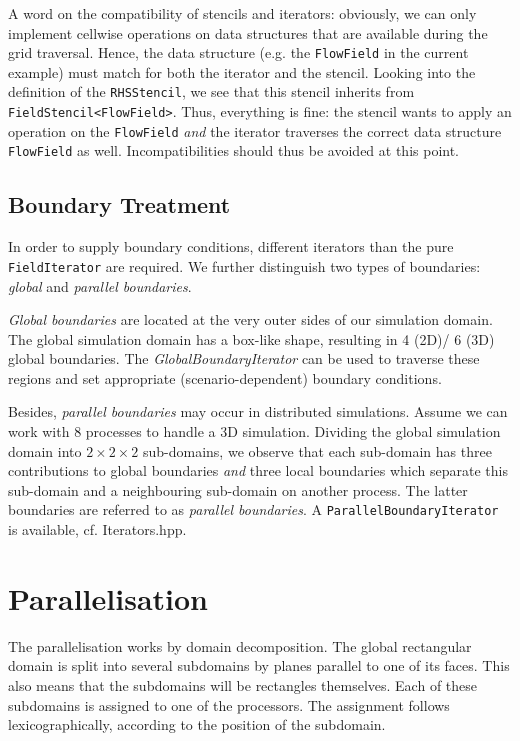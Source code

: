 \documentclass[pdftex,A4]{article}
\begin{document}
A word on the compatibility of stencils and iterators: obviously, we can only implement cellwise operations on data structures that are available during the grid traversal.
Hence, the data structure (e.g. the {\tt FlowField} in the current example) must match for both the iterator and the stencil.
Looking into the definition of the {\tt RHSStencil}, we see that this stencil inherits from {\tt FieldStencil<FlowField>}.
Thus, everything is fine: the stencil wants to apply an operation on the {\tt FlowField} {\it and} the iterator traverses the correct data structure {\tt FlowField} as well.
Incompatibilities should thus be avoided at this point.

\subsection{Boundary Treatment}\label{sec:boundary_treatment}

In order to supply boundary conditions, different iterators than the pure {\tt Field\-Iterator} are required.
We further distinguish two types of boundaries: {\it global} and {\it parallel boundaries}.

{\it Global boundaries} are located at the very outer sides of our simulation domain.
The global simulation domain has a box-like shape, resulting in 4 (2D)/ 6 (3D) global boundaries.
The {\it GlobalBoundaryIterator} can be used to traverse these regions and set appropriate (scenario-dependent) boundary conditions.

Besides, {\it parallel boundaries} may occur in distributed simulations.
Assume we can work with 8 processes to handle a 3D simulation.
Dividing the global simulation domain into $2\times 2\times 2$ sub-domains, we observe that each sub-domain has three contributions to global boundaries {\it and} three local boundaries which separate this sub-domain and a neighbouring sub-domain on another process.
The latter boundaries are referred to as {\it parallel boundaries}.
A {\tt ParallelBoundaryIterator} is available, cf. Iterators.hpp.

\section{Parallelisation}\label{sec:parallelisation}

The parallelisation works by domain decomposition. The global rectangular domain is split into several subdomains by planes parallel to one of its faces. This also means that the subdomains will be rectangles themselves.
Each of these subdomains is assigned to one of the processors. The assignment follows lexicographically, according to the position of the subdomain.
\end{document}

